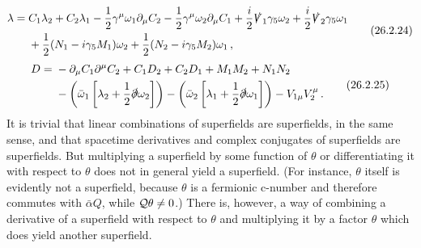 \begin{equation}
  \begin{aligned}
  \lambda={}&C_1\lambda_2+C_2\lambda_1
  -\frac12\gamma^\mu\omega_1\partial_\mu C_2
  -\frac12\gamma^\mu\omega_2\partial_\mu C_1
  +\frac{i}{2}\sl{V}_1\gamma_5\omega_2
  +\frac{i}{2}\sl{V}_2\gamma_5\omega_1\\
  &+\frac12(N_1-i\gamma_5M_1)\omega_2
  +\frac12(N_2-i\gamma_5M_2)\omega_1\,,
  \end{aligned}
  \tag{26.2.24}\label{eq:26.2.24}
\end{equation}
\begin{equation}
  \begin{aligned}
  D={}&-\partial_\mu C_1\partial^\mu C_2+C_1D_2+C_2D_1
  +M_1M_2+N_1N_2\\
  &-\left(\bar\omega_1
    \left[\lambda_2+\frac12\sl{\partial}\omega_2\right]\right)
  -\left(\bar\omega_2
    \left[\lambda_1+\frac12\sl{\partial}\omega_1\right]\right)
  -V_{1\mu}V_2^\mu\,.
  \end{aligned}
  \tag{26.2.25}\label{eq:26.2.25}
\end{equation}
It is trivial that linear combinations of superfields are superfields, in the
same sense, and that spacetime derivatives and complex conjugates of
superfields are superfields. But multiplying a superfield by some function of
$\theta$ or differentiating it with respect to $\theta$ does not in general
yield a superfield. (For instance, $\theta$ itself is evidently not a
superfield, because $\theta$ is a fermionic c-number and therefore commutes
with $\bar\alpha Q$, while $\SuperQ\theta\neq0$.) There is, however, a way of
combining a derivative of a superfield with respect to $\theta$ and
multiplying it by a factor $\theta$ which does yield another superfield.


